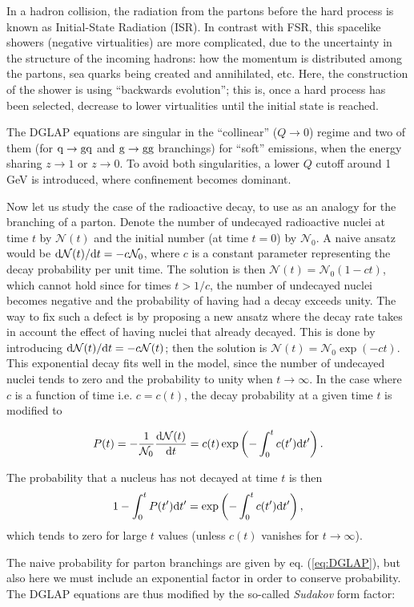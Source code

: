 \documentclass[a4paper,12pt]{article}
\begin{document}
In a hadron collision, the radiation from the partons before the hard process is known as Initial-State Radiation (ISR). In contrast with FSR, this spacelike showers (negative virtualities) are more complicated, due to the uncertainty in the structure of the incoming hadrons: how the momentum is distributed among the partons, sea quarks being created and annihilated, etc. Here, the construction of the shower is using ``backwards evolution''; this is, once a hard process has been selected, decrease to lower virtualities until the initial state is reached.

The DGLAP equations are singular in the ``collinear'' ($Q \to 0$) regime and two of them (for ${\mathrm q} \to {\mathrm g}{\mathrm q}$ and ${\mathrm g}\to{\mathrm g}{\mathrm g}$ branchings) for ``soft'' emissions, when the energy sharing $z\to 1$ or $z\to 0$. To avoid both singularities, a lower $Q$ cutoff around 1 GeV is introduced, where confinement becomes dominant.

Now let us study the case of the radioactive decay, to use as an analogy for the branching of a parton. Denote the number of undecayed radioactive nuclei at time $t$ by $\mathcal N(t)$ and the initial number (at time $t=0$) by $\mathcal N_0$. A naive ansatz would be ${\mathrm d}\mathcal N(t)/{\mathrm d} t = -c \mathcal N_0$, where $c$ is a constant parameter representing the decay probability per unit time. The solution is then $\mathcal N (t) = \mathcal N_0(1-ct)$, which cannot hold since for times $t>1/c$, the number of undecayed nuclei becomes negative and the probability of having had a decay exceeds unity. The way to fix such a defect is by proposing a new ansatz where the decay rate takes in account the effect of having nuclei that already decayed. This is done by introducing ${\mathrm d}\mathcal N(t)/{\mathrm d} t = -c \mathcal N(t)$; then the solution is $\mathcal N(t) = \mathcal N_0 \exp(-ct)$. This exponential decay fits well in the model, since the number of undecayed nuclei tends to zero and the probability to unity when $t\to\infty$. In the case where $c$ is a function of time i.e. $c=c(t)$, the decay probability at a given time $t$ is modified to

$$P(t)=-\frac{1}{\mathcal N_0} \frac{{\mathrm d}\mathcal N (t)}{{\mathrm d} t} = c(t) \exp\left(-\int_0^t c(t') {\mathrm d} t'\right).$$

The probability that a nucleus has not decayed at time $t$ is then $$1- \int_0^t P(t'){\mathrm d} t' = \exp \left(-\int_0^t c(t'){\mathrm d} t' \right),$$ which tends to zero for large $t$ values (unless $c(t)$ vanishes for $t\to\infty$).

The naive probability for parton branchings are given by eq. (\ref{eq:DGLAP}), but also here we must include an exponential factor in order to conserve probability. The DGLAP equations are thus modified by the so-called \textit{Sudakov} form factor:
\end{document}
